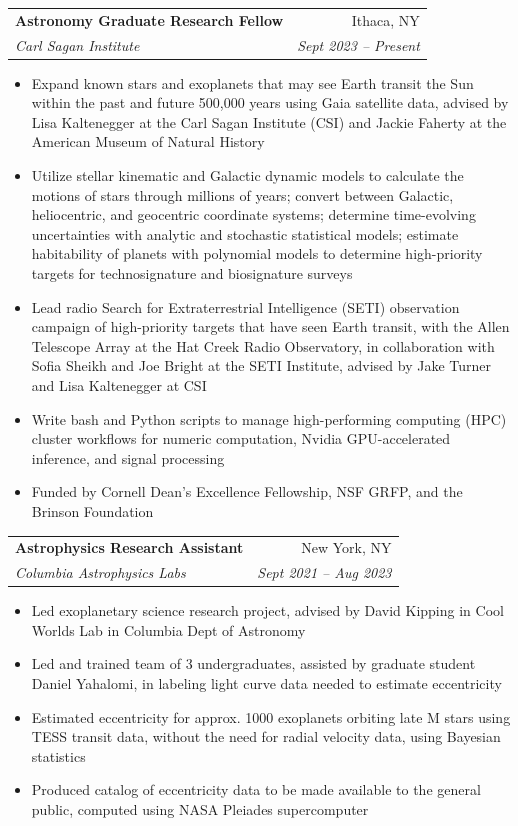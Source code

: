 \documentclass[a4paper,11pt]{article}
\makeatletter
\newcommand{\resumeItem}[1]{
  \item\small{
    {#1 \vspace{-2pt}}
  }
}
\newcommand{\resumeSubheading}[4]{
  \vspace{-2pt}\item
    \begin{tabular*}{0.97\textwidth}[t]{l@{\extracolsep{\fill}}r}
      \textbf{#1} & #2 \\
      \textit{\small#3} & \textit{\small #4} \\
    \end{tabular*}\vspace{-7pt}
}
\newcommand{\resumeItemListStart}{\begin{itemize}}
\newcommand{\resumeItemListEnd}{\end{itemize}\vspace{-5pt}}
\makeatother
\begin{document}
  \resumeSubheading
      {Astronomy Graduate Research Fellow}{Ithaca, NY}
      {Carl Sagan Institute}{Sept 2023 -- Present}
      \resumeItemListStart
        \resumeItem{Expand known stars and exoplanets that may see Earth transit the Sun within the past and future 500,000 years using Gaia satellite data, advised by Lisa Kaltenegger at the Carl Sagan Institute (CSI) and Jackie Faherty at the American Museum of Natural History}
        \resumeItem{Utilize stellar kinematic and Galactic dynamic models to calculate the motions of stars through millions of years; convert between Galactic, heliocentric, and geocentric coordinate systems; determine time-evolving uncertainties with analytic and stochastic statistical models; estimate habitability of planets with polynomial models to determine high-priority targets for technosignature and biosignature surveys}
        \resumeItem{Lead radio Search for Extraterrestrial Intelligence (SETI) observation campaign of high-priority targets that have seen Earth transit, with the Allen Telescope Array at the Hat Creek Radio Observatory, in collaboration with Sofia Sheikh and Joe Bright at the SETI Institute, advised by Jake Turner and Lisa Kaltenegger at CSI}
        \resumeItem{Write bash and Python scripts to manage high-performing computing (HPC) cluster workflows for numeric computation, Nvidia GPU-accelerated inference, and signal processing}
        \resumeItem{Funded by Cornell Dean's Excellence Fellowship, NSF GRFP, and the Brinson Foundation}
      \resumeItemListEnd

    \resumeSubheading
      {Astrophysics Research Assistant}{New York, NY}
      {Columbia Astrophysics Labs}{Sept 2021 -- Aug 2023}
      \resumeItemListStart
        \resumeItem{Led exoplanetary science research project, advised by David Kipping in Cool Worlds Lab in Columbia Dept of Astronomy}
        \resumeItem{Led and trained team of 3 undergraduates, assisted by graduate student Daniel Yahalomi, in labeling light curve data needed to estimate eccentricity}
        \resumeItem{Estimated eccentricity for approx. 1000 exoplanets orbiting late M stars using TESS transit data, without the need for radial velocity data, using Bayesian statistics}
        \resumeItem{Produced catalog of eccentricity data to be made available to the general public, computed using NASA Pleiades supercomputer}
      \resumeItemListEnd
  
\end{document}
